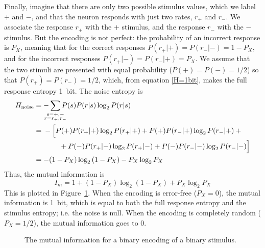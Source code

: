 Finally, imagine that there are only two possible stimulus values, which we label $+$ and $-$, and that the neuron responds with just two rates, $r_+$ and $r_-$. We associate the response $r_+$ with the $+$ stimulus, and the response $r_-$ with the $-$ stimulus. But the encoding is not perfect: the probability of an incorrect response is $P_X$, meaning that for the correct responses $P(r_+|+)=P(r_-|-)=1-P_X$, and for the incorrect responses $P(r_+|-)=P(r_-|+)=P_X$. We assume that the two stimuli are presented with equal probability ($P(+)=P(-)=1/2$) so that $P(r_+)=P(r_-)=1/2$, which, from equation \eqref{H=1bit}, makes the full response entropy \SI{1}{bit}. The noise entropy is
\begin{equation}
\begin{split}
H_{\text{noise}}&=-\sum_{\mathclap{\substack{s=+,-\\ r=r_+,r_-}}}P(s)P(r|s)\log_{2}P(r|s)\\
&=\begin{multlined}[t]
	-\Bigl[P(+)P(r_+|+)\log_2{P(r_+|+)}+P(+)P(r_-|+)\log_2{P(r_-|+)}+{}\\
	{}+P(-)P(r_+|-)\log_2{P(r_+|-)}+P(-)P(r_-|-)\log_2{P(r_-|-)}\Bigr]
\end{multlined}\\
&=-(1-P_X)\log_2{(1-P_X)}-P_X\log_2{P_X}
\end{split}
\end{equation}
Thus, the mutual information is
\begin{equation}
I_m=1+(1-P_X)\log_2{(1-P_X)}+P_X\log_2{P_X}
\end{equation}
This is plotted in Figure~\ref{ShannonEntropyBinaryCode1}. When the encoding is error-free ($P_X=0$), the mutual information is \SI{1}{bit}, which is equal to both the full response entropy and the stimulus entropy; i.e. the noise is null. When the encoding is completely random ($P_X=1/2$), the mutual information goes to 0.
\begin{figure}[h!t]
\centering
\pgfplotsset{set layers}
\caption{The mutual information for a binary encoding of a binary stimulus.}\label{ShannonEntropyBinaryCode1}
\end{figure}

